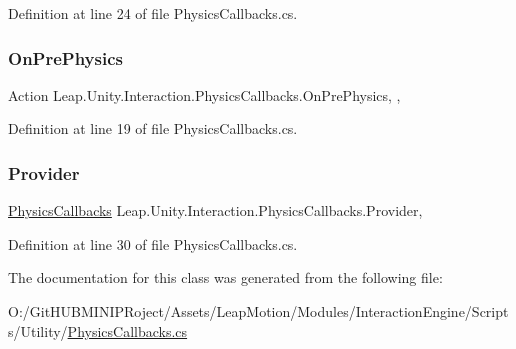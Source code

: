 Definition at line 24 of file Physics\+Callbacks.\+cs.

\mbox{\label{class_leap_1_1_unity_1_1_interaction_1_1_physics_callbacks_a9555d4e89cbdac16aec738e76b3b7676}} 
\subsubsection{\texorpdfstring{OnPrePhysics}{OnPrePhysics}}
{\footnotesize\ttfamily Action Leap.\+Unity.\+Interaction.\+Physics\+Callbacks.\+On\+Pre\+Physics\hspace{0.3cm}{\ttfamily [static]}, {\ttfamily [get]}, {\ttfamily [set]}}



Definition at line 19 of file Physics\+Callbacks.\+cs.

\mbox{\label{class_leap_1_1_unity_1_1_interaction_1_1_physics_callbacks_ac953c36688d7cf97ddbe9674411c3e1b}} 
\subsubsection{\texorpdfstring{Provider}{Provider}}
{\footnotesize\ttfamily \mbox{\hyperlink{class_leap_1_1_unity_1_1_interaction_1_1_physics_callbacks}{Physics\+Callbacks}} Leap.\+Unity.\+Interaction.\+Physics\+Callbacks.\+Provider\hspace{0.3cm}{\ttfamily [static]}, {\ttfamily [get]}}



Definition at line 30 of file Physics\+Callbacks.\+cs.



The documentation for this class was generated from the following file\+:\begin{DoxyCompactItemize}
\item 
O\+:/\+Git\+H\+U\+B\+M\+I\+N\+I\+P\+Roject/\+Assets/\+Leap\+Motion/\+Modules/\+Interaction\+Engine/\+Scripts/\+Utility/\mbox{\hyperlink{_physics_callbacks_8cs}{Physics\+Callbacks.\+cs}}\end{DoxyCompactItemize}
